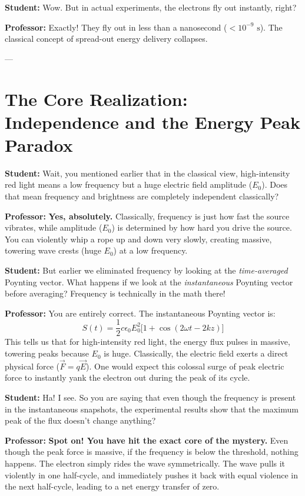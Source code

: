 \documentclass[11pt,a4paper]{article}
\newcommand{\Professor}{\noindent\textbf{\textcolor{profcolor}{Professor:}} }
\newcommand{\Student}{\noindent\textbf{\textcolor{studcolor}{Student:}} }
\begin{document}
	\Student Wow. But in actual experiments, the electrons fly out instantly, right?
	
	\Professor Exactly! They fly out in less than a nanosecond ($< 10^{-9} \text{ s}$). The classical concept of spread-out energy delivery collapses.
	
	---
	
	\section{The Core Realization: Independence and the Energy Peak Paradox}
	
	\Student Wait, you mentioned earlier that in the classical view, high-intensity red light means a low frequency but a huge electric field amplitude ($E_0$). Does that mean frequency and brightness are completely independent classically?
	
	\Professor \textbf{Yes, absolutely.} Classically, frequency is just how fast the source vibrates, while amplitude ($E_0$) is determined by how hard you drive the source. You can violently whip a rope up and down very slowly, creating massive, towering wave crests (huge $E_0$) at a low frequency. 
	
	\Student But earlier we eliminated frequency by looking at the \textit{time-averaged} Poynting vector. What happens if we look at the \textit{instantaneous} Poynting vector before averaging? Frequency is technically in the math there!
	
	\Professor You are entirely correct. The instantaneous Poynting vector is:
	\begin{equation}
		S(t) = \frac{1}{2} c \epsilon_0 E_0^2 \Big[ 1 + \cos(2\omega t - 2kz) \Big]
	\end{equation}
	This tells us that for high-intensity red light, the energy flux pulses in massive, towering peaks because $E_0$ is huge. Classically, the electric field exerts a direct physical force ($\vec{F}=q\vec{E}$). One would expect this colossal surge of peak electric force to instantly yank the electron out during the peak of its cycle. 
	
	\Student Ha! I see. So you are saying that even though the frequency is present in the instantaneous snapshots, the experimental results show that the maximum peak of the flux doesn't change anything?
	
	\Professor \textbf{Spot on! You have hit the exact core of the mystery.} Even though the peak force is massive, if the frequency is below the threshold, nothing happens. The electron simply rides the wave symmetrically. The wave pulls it violently in one half-cycle, and immediately pushes it back with equal violence in the next half-cycle, leading to a net energy transfer of zero. 
	
\end{document}
